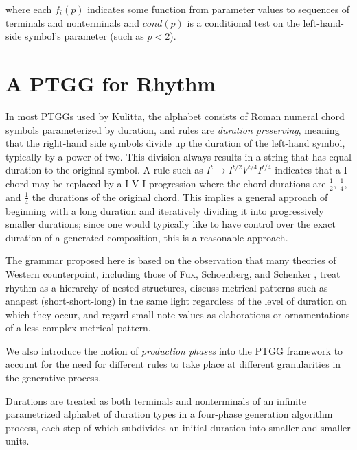 \documentclass{article}
\begin{document}
\noindent where each $f_{i}(p)$ indicates some function from parameter values to sequences of terminals and nonterminals and $cond(p)$ is a conditional test on the left-hand-side symbol's parameter (such as $p<2$).


\section{A PTGG for Rhythm}


In most PTGGs used by Kulitta, the alphabet consists of Roman numeral chord symbols parameterized by duration, and rules are \emph{duration preserving}, meaning that the right-hand side symbols divide up the duration of the left-hand symbol, typically by a power of two. This division always results in a string that has equal duration to the original symbol. A rule such as $I^{t} \rightarrow I^{t/2} V^{t/4} I^{t/4}$ indicates that a I-chord may be replaced by a I-V-I progression where the chord durations are $\frac{1}{2}$, $\frac{1}{4}$, and $\frac{1}{4}$ the durations of the original chord. This implies a general approach of beginning with a long duration and iteratively dividing it into progressively smaller durations; since one would typically like to have control over the exact duration of a generated composition, this is a reasonable approach.

The grammar proposed here is based on the observation that many theories of Western counterpoint, including those of Fux, Schoenberg, and Schenker \cite{[TO-DO]}, treat rhythm as a hierarchy of nested structures, discuss metrical patterns such as anapest (short-short-long) in the same light regardless of the level of duration on which they occur, and regard small note values as elaborations or ornamentations of a less complex metrical pattern.

We also introduce the notion of \emph{production phases} into the PTGG framework to account for the need for different rules to take place at different granularities in the generative process.

Durations are treated as both terminals and nonterminals of an infinite parametrized alphabet of duration types in a four-phase generation algorithm process, each step of which subdivides an initial duration into smaller and smaller units.
\end{document}
